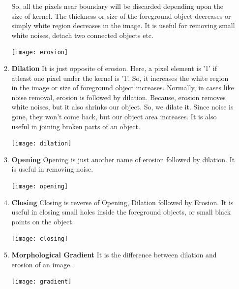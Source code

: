 \documentclass[12pt,a4paper]{article}
\begin{document}
\begin{enumerate}
\begin{enumerate}
    So, all the pixels near boundary will be discarded depending upon the size of kernel. The thickness or size of the foreground object decreases or simply white region decreases in the image. It is useful for removing small white noises, detach two connected objects etc.
    \begin{center}
        \texttt{[image: erosion]}
    \end{center}
    \item \textbf{Dilation}
    It is just opposite of erosion. Here, a pixel element is '1' if atleast one pixel under the kernel is '1'. So, it increases the white region in the image or size of foreground object increases. Normally, in cases like noise removal, erosion is followed by dilation. Because, erosion removes white noises, but it also shrinks our object. So, we dilate it. Since noise is gone, they won't come back, but our object area increases. It is also useful in joining broken parts of an object. 
    \begin{center}
        \texttt{[image: dilation]}
    \end{center}
    \item \textbf{Opening}
    Opening is just another name of erosion followed by dilation. It is useful in removing noise.
    \begin{center}
        \texttt{[image: opening]}
    \end{center}
    \item \textbf{Closing}
    Closing is reverse of Opening, Dilation followed by Erosion. It is useful in closing small holes inside the foreground objects, or small black points on the object. \begin{center}
        \texttt{[image: closing]}
    \end{center}
    \item \textbf{Morphological Gradient}
    It is the difference between dilation and erosion of an image.
    \begin{center}
        \texttt{[image: gradient]}
    \end{center}
    \end{enumerate}
    \pagebreak
\end{enumerate}
\end{document}
